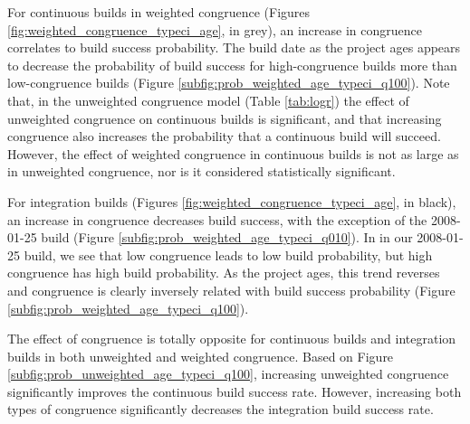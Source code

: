 


For continuous builds in weighted congruence (Figures \ref{fig:weighted_congruence_typeci_age}, in grey), an increase in congruence correlates to build success probability. The build date as the project ages appears to decrease the probability of build success for high-congruence builds more than low-congruence builds (Figure \ref{subfig:prob_weighted_age_typeci_q100}). Note that, in the unweighted congruence model (Table \ref{tab:logr}) the effect of unweighted congruence on continuous builds is significant, and that increasing congruence also increases the probability that a continuous build will succeed. However, the effect of weighted congruence in continuous builds is not as large as in unweighted congruence, nor is it considered statistically significant.

For integration builds (Figures \ref{fig:weighted_congruence_typeci_age}, in black), an increase in congruence decreases build success, with the exception of the 2008-01-25 build (Figure \ref{subfig:prob_weighted_age_typeci_q010}). In in our 2008-01-25 build, we see that low congruence leads to low build probability, but high congruence has high build probability. As the project ages, this trend reverses and congruence is clearly inversely related with build success probability (Figure \ref{subfig:prob_weighted_age_typeci_q100}).

The effect of congruence is totally opposite for continuous builds and integration builds in both unweighted and weighted congruence. Based on Figure \ref{subfig:prob_unweighted_age_typeci_q100}, increasing unweighted congruence significantly improves the continuous build success rate. However, increasing both types of congruence significantly decreases the integration build success rate.


